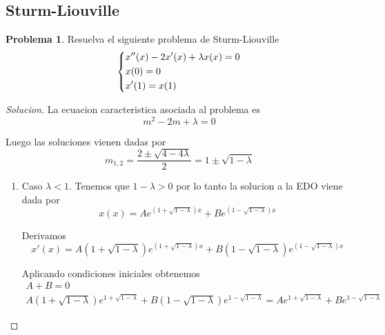 \documentclass{article}
\theoremstyle{definition}
\newtheorem{problem}{Problema}
\newenvironment{solution}{\begin{proof}[Solucion]}{\end{proof}}
\begin{document}
\subsection{Sturm-Liouville}
\begin{problem}
  Resuelva el siguiente problema de Sturm-Liouville
  \begin{equation*}
    \begin{dcases}
      x''(x) - 2x'(x) + \lambda x(x) = 0\\
      x(0) = 0\\
      x'(1) = x(1)
    \end{dcases}
  \end{equation*}
\end{problem}
\begin{solution}
    La ecuacion caracteristica asociada al problema es
    \begin{equation*}
      m^{2} - 2m + \lambda = 0
    \end{equation*}

    Luego las soluciones vienen dadas por
    \begin{equation*}
      m_{1,2} = \frac{2 \pm \sqrt{4 - 4\lambda}}{2} = 1 \pm \sqrt{1 - \lambda}
    \end{equation*}

    \begin{enumerate}
      \item Caso $\lambda < 1$. Tenemos que $1 - \lambda > 0$ por lo tanto la solucion a la EDO
            viene dada por
            \begin{equation*}
              x(x) = Ae^{(1 + \sqrt{1 - \lambda})x} + B e^{(1 - \sqrt{1 - \lambda})x}
            \end{equation*}

            Derivamos
            \begin{equation*}
              x'(x) = A(1 + \sqrt{1 - \lambda})e^{(1 + \sqrt{1 - \lambda})x} + B(1 - \sqrt{1 - \lambda})e^{(1 - \sqrt{1 - \lambda})x}
            \end{equation*}

            Aplicando condiciones iniciales obtenemos
            \begin{gather*}
              A + B = 0\\
              A(1 + \sqrt{1 - \lambda})e^{1 + \sqrt{1 - \lambda}} + B(1 - \sqrt{1 - \lambda})e^{1 - \sqrt{1 - \lambda}} = Ae^{1 + \sqrt{1 - \lambda}} + Be^{1 - \sqrt{1 - \lambda}}
            \end{gather*}


\end{enumerate}
\end{solution}
\end{document}

